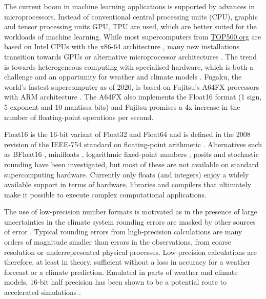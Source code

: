 The current boom in machine learning applications is supported by advances in microprocessors. Instead of conventional central
processing units (CPU), graphic and tensor processing units GPU, TPU \citep{Jouppi2018,Jouppi2018a,Jouppi2017,Steinkraus2005}
are used, which are better suited for the workloads of machine learning. While most supercomputers from \href{https://top500.org}{TOP500.org}
are based on Intel CPUs with the x86-64 architecture \citep{Dongarra2011}, many new installations transition towards GPUs or alternative
microprocessor architectures \citep{Zheng2020}. The trend is towards heterogeneous computing with specialised hardware, which is
both a challenge and an opportunity for weather and climate models \citep{Bauer2021,Bauer2021a}. Fugaku, the world’s fastest supercomputer
as of 2020, is based on Fujitsu’s A64FX processors with ARM architecture \citep{Odajima2020,Sato2020}. The A64FX also implements the
Float16 format (1 sign, 5 exponent and 10 mantissa bits) and Fujitsu promises a 4x increase in the number of floating-point
operations per second. 

Float16 is the 16-bit variant of Float32 and Float64 and is defined in the 2008 revision of the IEEE-754 standard on floating-point arithmetic
\citep{IEEE1985,IEEE2008}. Alternatives such as BFloat16 \citep{Burgess2019, Kalamkar2019}, minifloats \citep{Fox2020}, logarithmic
fixed-point numbers \citep{Johnson2020,Johnson2018,Sun2020}, posits
\citep{Gustafson2017a,Chaurasiya2018,Klower2019a,Klower2020a,Langroudi2019,Zhang2020} and stochastic rounding
\citep{Croci2020,Hopkins2020,Mikaitis2020,Paxton2021} have been investigated, but most of these are not available on
standard supercomputing hardware. Currently only floats (and integers) enjoy a widely available support in terms of hardware,
libraries and compilers that ultimately make it possible to execute complex computational applications.

The use of low-precision number formats is motivated as in the presence of large uncertainties in the climate system rounding
errors are masked by other sources of error \citep{Palmer2015}. Typical rounding errors from high-precision calculations are
many orders of magnitude smaller than errors in the observations, from coarse resolution or underrepresented physical processes.
Low-precision calculations are therefore, at least in theory, sufficient without a loss in accuracy for a weather forecast or a climate prediction.
Emulated in parts of weather and climate models, 16-bit half precision has been shown to be a potential route to accelerated simulations
\citep{Dawson2018,Chantry2019, Hatfield2019, Klower2020a}.

